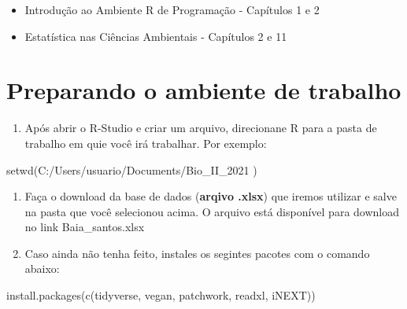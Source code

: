\documentclass[
]{book}
\newenvironment{Shaded}{\begin{snugshade}}{\end{snugshade}}
\newcommand{\FunctionTok}[1]{\textcolor[rgb]{0.00,0.00,0.00}{#1}}
\newcommand{\NormalTok}[1]{#1}
\newcommand{\StringTok}[1]{\textcolor[rgb]{0.31,0.60,0.02}{#1}}
\providecommand{\tightlist}{%
  \setlength{\itemsep}{0pt}\setlength{\parskip}{0pt}}
\begin{document}
\begin{itemize}
\item
  Introdução ao Ambiente R de Programação - Capítulos 1 e 2
\item
  Estatística nas Ciências Ambientais - Capítulos 2 e 11
\end{itemize}

\hypertarget{preparando-o-ambiente-de-trabalho}{%
\section{Preparando o ambiente de trabalho}\label{preparando-o-ambiente-de-trabalho}}

\begin{enumerate}
\def\labelenumi{\arabic{enumi}.}
\tightlist
\item
  Após abrir o R-Studio e criar um arquivo, direcionane R para a pasta de trabalho em quie você irá trabalhar. Por exemplo:
\end{enumerate}

\begin{Shaded}
\begin{Highlighting}[]
\FunctionTok{setwd}\NormalTok{(}\StringTok{\textquotesingle{}C:/Users/usuario/Documents/Bio\_II\_2021\textquotesingle{}}\NormalTok{ )}
\end{Highlighting}
\end{Shaded}

\begin{enumerate}
\def\labelenumi{\arabic{enumi}.}
\setcounter{enumi}{1}
\item
  Faça o download da base de dados (\textbf{arqivo .xlsx}) que iremos utilizar e salve na pasta que você selecionou acima. O arquivo está disponível para download no link Baia\_santos.xlsx
\item
  Caso ainda não tenha feito, instales os segintes pacotes com o comando abaixo:
\end{enumerate}

\begin{Shaded}
\begin{Highlighting}[]
\FunctionTok{install.packages}\NormalTok{(}\FunctionTok{c}\NormalTok{(}\StringTok{\textquotesingle{}tidyverse\textquotesingle{}}\NormalTok{, }\StringTok{\textquotesingle{}vegan\textquotesingle{}}\NormalTok{, }\StringTok{\textquotesingle{}patchwork\textquotesingle{}}\NormalTok{, }\StringTok{\textquotesingle{}readxl\textquotesingle{}}\NormalTok{, }\StringTok{\textquotesingle{}iNEXT\textquotesingle{}}\NormalTok{))}
\end{Highlighting}
\end{Shaded}
\end{document}

